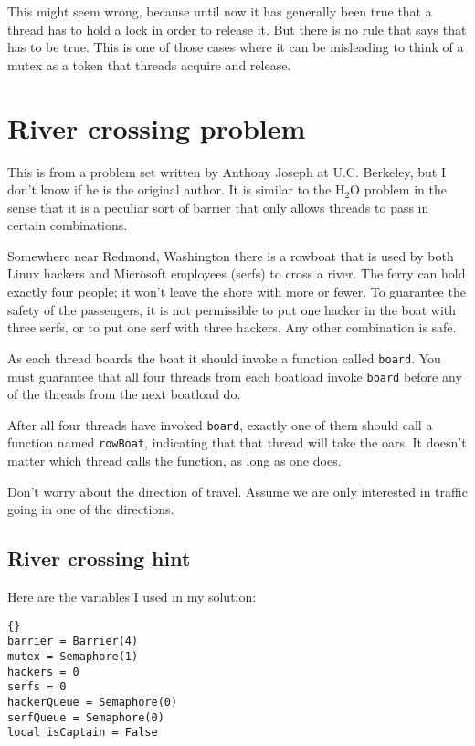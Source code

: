 \documentclass{book}
\newcommand{\clearemptydoublepage}{\newpage\cleardoublepage}
\begin{document}
This might seem wrong, because until now it
has generally been true that a thread has to hold a lock in
order to release it.  But there is no rule that says that has
to be true.  This is one of those cases where it can be misleading
to think of a mutex as a token that threads acquire and release.


\section {River crossing problem}

This is from a problem set written by Anthony Joseph
at U.C. Berkeley, but I don't know if he is the original author.
It is similar to the H$_2$O problem in the sense that it is
a peculiar sort of barrier that only allows threads to pass
in certain combinations.

Somewhere near Redmond, Washington there is a rowboat that is used by
both Linux hackers and Microsoft employees (serfs) to cross a river.  The
ferry can hold exactly four people; it won't leave the shore with more
or fewer.  To guarantee the safety of the passengers, it is not
permissible to put one hacker in the boat with three serfs, or to
put one serf with three hackers.  Any other combination is safe.

As each thread boards the boat it should invoke a function
called {\tt board}.  You must guarantee that all four threads
from each boatload invoke {\tt board} before any of the threads
from the next boatload do.

After all four threads have invoked {\tt board}, exactly one of
them should call a function named {\tt rowBoat}, indicating
that that thread will take the oars.  It doesn't matter which thread
calls the function, as long as one does.

Don't worry about the direction of travel.  Assume we are
only interested in traffic going in one of the directions.


\clearemptydoublepage
\subsection {River crossing hint}

Here are the variables I used in my solution:

\begin{lstlisting}[title={River crossing hint}]{}
barrier = Barrier(4)
mutex = Semaphore(1)
hackers = 0
serfs = 0
hackerQueue = Semaphore(0)
serfQueue = Semaphore(0)
local isCaptain = False
\end{lstlisting}
\end{document}

